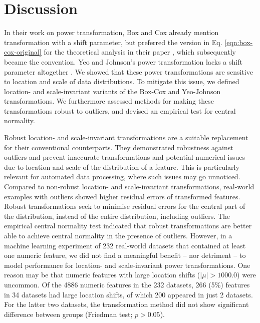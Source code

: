 \documentclass[preprint,12pt,authoryear]{elsarticle}
\begin{document}
\section{Discussion}\label{discussion}

In their work on power transformation, Box and Cox already mention
transformation with a shift parameter, but preferred the version in Eq.
\ref{eqn:box-cox-original} for the theoretical analysis in their paper
\citep{Box1964-mz}, which subsequently became the convention. Yeo and
Johnson's power transformation lacks a shift parameter altogether 
\citep{Yeo2000-vw}. We showed that these power transformations are
sensitive to location and scale of data distributions. To mitigate this
issue, we defined location- and scale-invariant variants of the Box-Cox
and Yeo-Johnson transformations. We furthermore assessed methods for
making these transformations robust to outliers, and devised an
empirical test for central normality.

Robust location- and scale-invariant transformations are a suitable
replacement for their conventional counterparts. They demonstrated
robustness against outliers and prevent inaccurate transformations and
potential numerical issues due to location and scale of the distribution
of a feature. This is particularly relevant for automated data
processing, where such issues may go unnoticed. Compared to non-robust
location- and scale-invariant transformations, real-world examples with
outliers showed higher residual errors of transformed features. Robust
transformations seek to minimise residual errors for the central part of
the distribution, instead of the entire distribution, including
outliers. The empirical central normality test indicated that robust
transformations are better able to achieve central normality in the
presence of outliers. However, in a machine learning experiment of 232
real-world datasets that contained at least one numeric feature, we did
not find a meaningful benefit -- nor detriment -- to model performance
for location- and scale-invariant power transformations. One reason may
be that numeric features with large location shifts (\(|\mu| > 1000.0\))
were uncommon. Of the 4886 numeric features in the 232 datasets, 266
(5\%) features in 34 datasets had large location shifts, of which 200
appeared in just 2 datasets. For the latter two datasets, the
transformation method did not show significant difference between groups
(Friedman test; \(p > 0.05\)).
\end{document}
